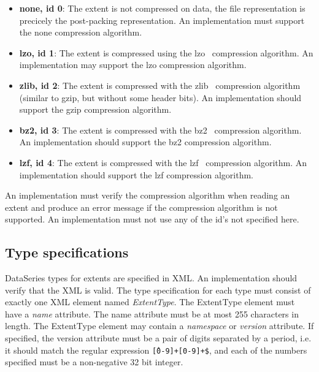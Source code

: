 \begin{itemize}

\item {\bf none, id 0}: The extent is not compressed on data, the file
  representation is precicely the post-packing representation.  An
  implementation must support the none compression algorithm.

\item {\bf lzo, id 1}: The extent is compressed using the
  lzo~\cite{LZO} compression algorithm.  An implementation may support
  the lzo compression algorithm.

\item {\bf zlib, id 2}: The extent is compressed with the
  zlib~\cite{GZIP} compression algorithm (similar to gzip, but without
  some header bits).  An implementation should support the gzip
  compression algorithm.

\item {\bf bz2, id 3}: The extent is compressed with the
  bz2~\cite{BZIP2} compression algorithm.  An implementation should
  support the bz2 compression algorithm.

\item {\bf lzf, id 4}: The extent is compressed with the
  lzf~\cite{LZF} compression algorithm.  An implementation should
  support the lzf compression algorithm.

\end{itemize}

An implementation must verify the compression algorithm when reading
an extent and produce an error message if the compression algorithm is
not supported.  An implementation must not use any of the id's not
specified here.

\subsection{Type specifications}

DataSeries types for extents are specified in XML.  An implementation should
verify that the XML is valid.  The type specification for each type must
consist of exactly one XML element named {\it ExtentType}.  The ExtentType
element must have a {\it name} attribute.  The name attribute must be at most
255 characters in length.  The ExtentType element may contain a {\it namespace}
or {\it version} attribute.  If specified, the version attribute must be a pair
of digits separated by a period, i.e. it should match the regular expression
\texttt{\^[0-9]+\.[0-9]+\$}, and each of the numbers specified must be a
non-negative 32 bit integer.

